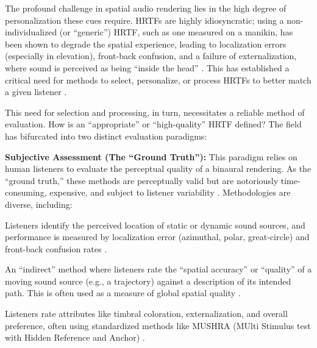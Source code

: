 \documentclass[12pt,a4paper]{article}
\begin{document}
The profound challenge in spatial audio rendering lies in the high degree of personalization these cues require. HRTFs are highly idiosyncratic; using a non-individualized (or ``generic'') HRTF, such as one measured on a manikin, has been shown to degrade the spatial experience, leading to localization errors (especially in elevation), front-back confusion, and a failure of externalization, where sound is perceived as being ``inside the head'' \cite{asaudio2025}. This has established a critical need for methods to select, personalize, or process HRTFs to better match a given listener \cite{andreopoulou2022}.

This need for selection and processing, in turn, necessitates a reliable method of evaluation. How is an ``appropriate'' or ``high-quality'' HRTF defined? The field has bifurcated into two distinct evaluation paradigms:

\textbf{Subjective Assessment (The ``Ground Truth''):} This paradigm relies on human listeners to evaluate the perceptual quality of a binaural rendering. As the ``ground truth,'' these methods are perceptually valid but are notoriously time-consuming, expensive, and subject to listener variability \cite{andreopoulou_icmc2014}. Methodologies are diverse, including:

\begin{description}[style=unboxed, leftmargin=1.5em]
  \item[Localization Pointing Tasks:] Listeners identify the perceived location of static or dynamic sound sources, and performance is measured by localization error (azimuthal, polar, great-circle) and front-back confusion rates \cite{zhang2025}.
  \item[Trajectory Rating:] An ``indirect'' method where listeners rate the ``spatial accuracy'' or ``quality'' of a moving sound source (e.g., a trajectory) against a description of its intended path. This is often used as a measure of global spatial quality \cite{andreopoulou2022}.
  \item[Comparative Quality Assessment:] Listeners rate attributes like timbral coloration, externalization, and overall preference, often using standardized methods like MUSHRA (MUlti Stimulus test with Hidden Reference and Anchor) \cite{itu2015}.
\end{description}
\end{document}
